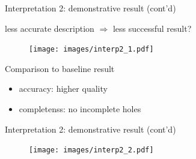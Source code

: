 \documentclass[10pt]{beamer}
\begin{document}
\begin{frame}{Interpretation 2: demonstrative result (cont'd)}

less accurate description $\Rightarrow$ less successful result?

\begin{figure}
\centering
\texttt{[image: images/interp2\_1.pdf]}
\end{figure}

\begin{exampleblock}{Comparison to baseline result}
\begin{itemize}
\item accuracy: higher quality
\item completenss: no incomplete holes
\end{itemize}
\end{exampleblock}

\end{frame}

\begin{frame}{Interpretation 2: demonstrative result (cont'd)}

\begin{figure}
\centering
\texttt{[image: images/interp2\_2.pdf]}
\end{figure}

\end{frame}
\end{document}
